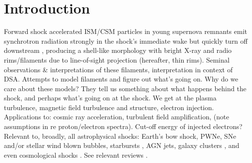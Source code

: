 \documentclass[iop, apj, numberedappendix, twocolappendix]{emulateapj}
\begin{document}

\section{Introduction}


Forward shock accelerated ISM/CSM particles in young supernova remnants emit
synchrotron radiation strongly in the shock's immediate wake but quickly turn
off downstream \citep{koyama1995, reynolds1996}, producing a shell-like
morphology with bright X-ray and radio rims/filaments due to line-of-sight
projection (hereafter, thin rims).
Seminal observations \& interpretations of these filaments, interpretation in
context of DSA.  Attempts to model filaments and figure out what's going on.
Why do we care about these models?  They tell us something about what happens
behind the shock, and perhaps what's going on at the shock.  We get at the
plasma turbulence, magnetic field turbulence and structure, electron injection.
Applications to: cosmic ray acceleration, turbulent field amplification, (note
assumptions in re proton/electron spectra).
Cut-off energy of injected
electrons?  Relevant to, broadly, all astrophysical shocks: Earth's bow shock,
PWNe, SNe and/or stellar wind blown bubbles, starbursts \citep{heckman1990},
AGN jets, galaxy clusters \citep{van-weeren2010}, and even cosmological shocks
\citep{miniati2000, ryu2008}.  See relevant reviews \citep{blandford1987}.
\end{document}
